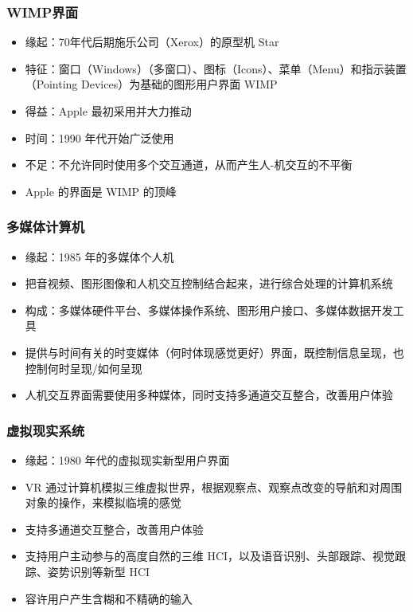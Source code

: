 \documentclass[cs4size,a4paper,10pt]{ctexart}
\begin{document}
		\subsubsection{WIMP界面}
		\begin{itemize}
			\item 缘起：70年代后期施乐公司（Xerox）的原型机 Star
			\item 特征：窗口（Windows）（多窗口）、图标（Icons）、菜单（Menu）和指示装置（Pointing Devices）为基础的图形用户界面 WIMP
			\item 得益：Apple 最初采用并大力推动
			\item 时间：1990 年代开始广泛使用
			\item 不足：不允许同时使用多个交互通道，从而产生人-机交互的不平衡
			\item Apple 的界面是 WIMP 的顶峰
		\end{itemize}


		\subsubsection{多媒体计算机}
		\begin{itemize}
			\item 缘起：1985 年的多媒体个人机
			\item 把音视频、图形图像和人机交互控制结合起来，进行综合处理的计算机系统
			\item 构成：多媒体硬件平台、多媒体操作系统、图形用户接口、多媒体数据开发工具
			\item 提供与时间有关的时变媒体（何时体现感觉更好）界面，既控制信息呈现，也控制何时呈现/如何呈现
			\item 人机交互界面需要使用多种媒体，同时支持多通道交互整合，改善用户体验
		\end{itemize}


		\subsubsection{虚拟现实系统}
		\begin{itemize}
			\item 缘起：1980 年代的虚拟现实新型用户界面
			\item VR 通过计算机模拟三维虚拟世界，根据观察点、观察点改变的导航和对周围对象的操作，来模拟临境的感觉
			\item 支持多通道交互整合，改善用户体验
			\item 支持用户主动参与的高度自然的三维 HCI，以及语音识别、头部跟踪、视觉跟踪、姿势识别等新型 HCI
			\item 容许用户产生含糊和不精确的输入
		\end{itemize}
\end{document}
